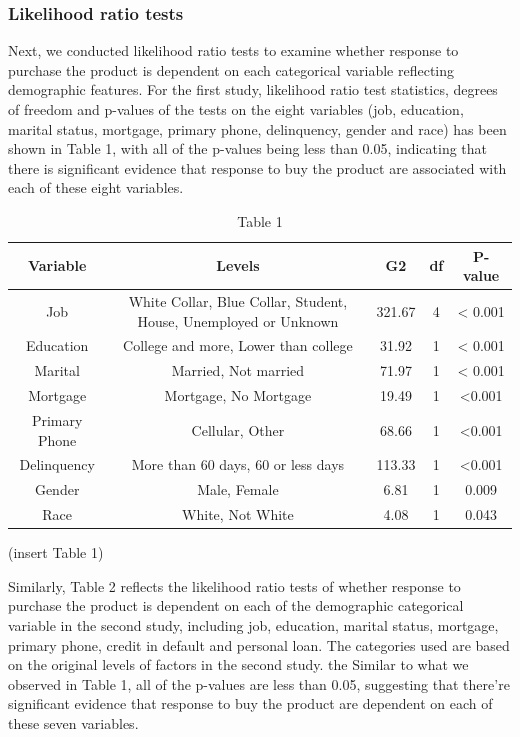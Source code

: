 \documentclass[]{article}
\begin{document}
\newpage

\hypertarget{likelihood-ratio-tests}{%
\subsubsection{Likelihood ratio tests}\label{likelihood-ratio-tests}}

Next, we conducted likelihood ratio tests to examine whether response to
purchase the product is dependent on each categorical variable
reflecting demographic features. For the first study, likelihood ratio
test statistics, degrees of freedom and p-values of the tests on the
eight variables (job, education, marital status, mortgage, primary
phone, delinquency, gender and race) has been shown in Table 1, with all
of the p-values being less than 0.05, indicating that there is
significant evidence that response to buy the product are associated
with each of these eight variables.

\begin{table}
    \centering
    \begin{tabular}{ |c | c | c | c | c |}
    \hline
        Variable & Levels & G2 & df & P-value \\ \hline
        Job & White Collar, Blue Collar, Student, House, Unemployed or Unknown & 321.67 & 4 & < 0.001 \\ \hline
        Education & College and more, Lower than college & 31.92 & 1 & < 0.001 \\ \hline
        Marital & Married, Not married & 71.97 & 1 & < 0.001 \\ \hline
        Mortgage & Mortgage, No Mortgage & 19.49 & 1 & <0.001 \\ \hline
        Primary Phone & Cellular, Other & 68.66 & 1 & <0.001 \\ \hline
        Delinquency & More than 60 days, 60 or less days & 113.33 & 1 & <0.001 \\ \hline
        Gender & Male, Female & 6.81 & 1 & 0.009 \\ \hline
        Race & White, Not White & 4.08 & 1 & 0.043 \\ \hline
    \end{tabular}
    \caption{Table 1}
\end{table}

(insert Table 1)

Similarly, Table 2 reflects the likelihood ratio tests of whether
response to purchase the product is dependent on each of the demographic
categorical variable in the second study, including job, education,
marital status, mortgage, primary phone, credit in default and personal
loan. The categories used are based on the original levels of factors in
the second study. the Similar to what we observed in Table 1, all of the
p-values are less than 0.05, suggesting that there're significant
evidence that response to buy the product are dependent on each of these
seven variables.
\end{document}
